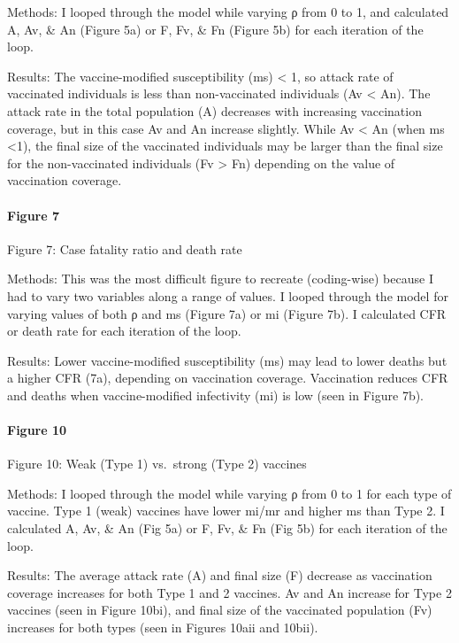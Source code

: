 \documentclass[]{article}
\let\oldparagraph\paragraph
\renewcommand{\paragraph}[1]{\oldparagraph{#1}\mbox{}}
\begin{document}
Methods: I looped through the model while varying ρ from 0 to 1, and
calculated A, Av, \& An (Figure 5a) or F, Fv, \& Fn (Figure 5b) for each
iteration of the loop.

Results: The vaccine-modified susceptibility (ms) \textless{} 1, so
attack rate of vaccinated individuals is less than non-vaccinated
individuals (Av \textless{} An). The attack rate in the total population
(A) decreases with increasing vaccination coverage, but in this case Av
and An increase slightly. While Av \textless{} An (when ms
\textless{}1), the final size of the vaccinated individuals may be
larger than the final size for the non-vaccinated individuals (Fv
\textgreater{} Fn) depending on the value of vaccination coverage.

\hypertarget{figure-7}{%
\paragraph{Figure 7}\label{figure-7}}

Figure 7: Case fatality ratio and death rate

Methods: This was the most difficult figure to recreate (coding-wise)
because I had to vary two variables along a range of values. I looped
through the model for varying values of both ρ and ms (Figure 7a) or mi
(Figure 7b). I calculated CFR or death rate for each iteration of the
loop.

Results: Lower vaccine-modified susceptibility (ms) may lead to lower
deaths but a higher CFR (7a), depending on vaccination coverage.
Vaccination reduces CFR and deaths when vaccine-modified infectivity
(mi) is low (seen in Figure 7b).

\hypertarget{figure-10}{%
\paragraph{Figure 10}\label{figure-10}}

Figure 10: Weak (Type 1) vs.~strong (Type 2) vaccines

Methods: I looped through the model while varying ρ from 0 to 1 for each
type of vaccine. Type 1 (weak) vaccines have lower mi/mr and higher ms
than Type 2. I calculated A, Av, \& An (Fig 5a) or F, Fv, \& Fn (Fig 5b)
for each iteration of the loop.

Results: The average attack rate (A) and final size (F) decrease as
vaccination coverage increases for both Type 1 and 2 vaccines. Av and An
increase for Type 2 vaccines (seen in Figure 10bi), and final size of
the vaccinated population (Fv) increases for both types (seen in Figures
10aii and 10bii).
\end{document}
